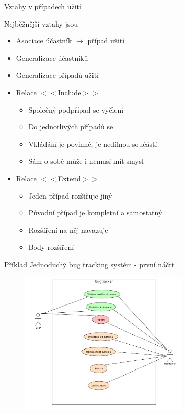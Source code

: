 
\begin{frame}{Vztahy v případech užití}

Nejběžnější vztahy jsou

\begin{itemize}
	\item Asociace účastník $\to$ případ užití
	\item Generalizace účastníků
	\item Generalizace případů užití
	\item Relace $<<$Include$>>$
	\begin{itemize}
		\item Společný podpřípad se vyčlení
		\item Do jednotlivých případů se 
		\item Vkládání je povinné, je nedílnou součástí
		\item Sám o sobě může i nemusí mít smysl
	\end{itemize}
	\item Relace $<<$Extend$>>$
	\begin{itemize}
		\item Jeden případ rozšiřuje jiný
		\item Původní případ je kompletní a samostatný
		\item Rozšíření na něj navazuje
		\item Body rozšíření
	\end{itemize}
\end{itemize}	
	
\end{frame}


\begin{frame}{Příklad}
Jednoduchý bug tracking systém - první náčrt
\begin{figure}
	\includegraphics[width=81mm]{img/diagramy/UseCase/bugtracker1.png}
\end{figure}

\end{frame}

